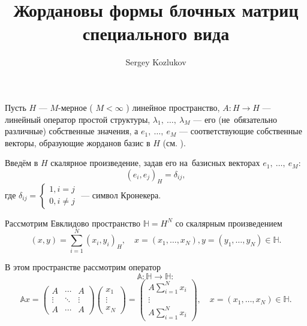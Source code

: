 \documentclass[a4paper]{article}
\title{Жордановы формы блочных матриц специального вида}
\author{Sergey Kozlukov}
\begin{document}
\maketitle

Пусть \( H \) --- \( M \)-мерное ( \( M < \infty \) ) линейное пространство,
\( A: H\to H \) --- линейный оператор простой структуры,
\( \lambda_1,~\ldots,~\lambda_M \) --- его (не~обязательно различные)
собственные значения, а \( e_1,~\ldots,~e_M \) --- соответствующие
собственные векторы, образующие жорданов базис в \( H \) (см. \cite{baskakov-algebra}).

Введём в \( H \) скалярное произведение, задав его на~базисных векторах
\( e_1,~\ldots,~e_M \):
\[ (e_i,e_j)_H = \delta_{ij}, \]
где \( \delta_{ij} = \left\{\begin{aligned} 1, i=j\\ 0, i\neq j\end{aligned}\right. \) --- символ Кронекера.

Рассмотрим Евклидово пространство \( \mathbb{H}=H^N \)
со скалярным произведением
\[ (x, y) = \sum_{i=1}^N (x_i,y_i)_H, \quad x=(x_1,\ldots,x_N),y=(y_1,\ldots,y_N) \in \mathbb{H}. \] 

В этом пространстве рассмотрим оператор
\[ \mathbb{A}: \mathbb{H}\to \mathbb{H}: \]
\[ \mathbb{A}x =
    \begin{pmatrix}
        A & \cdots & A \\
        \vdots & \ddots & \vdots \\
        A & \cdots & A
    \end{pmatrix}
    \begin{pmatrix}
        x_1 \\
        \vdots \\
        x_N
    \end{pmatrix}
    = \begin{pmatrix}
        A \sum_{i=1}^N x_i \\
        \vdots \\
        A \sum_{i=1}^N x_i
    \end{pmatrix},
    \quad x=(x_1,\ldots,x_N) \in \mathbb{H}. \]
\end{document}
